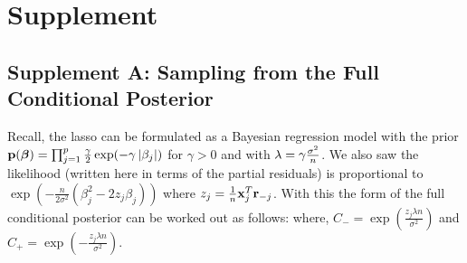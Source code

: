 \newpage

\section*{Supplement}

\subsection{Supplement A: Sampling from the Full Conditional Posterior}\label{Sup:A}


Recall, the lasso can be formulated as a Bayesian regression model with the prior $\mathbf{p}(\boldsymbol{\beta}) = \prod_{j = 1}^{p} \frac{\gamma}{2}\exp(-\gamma \left\lvert\beta_j\right\rvert)$ for $\gamma > 0$ and with $\lambda = \gamma \frac{\sigma^2}{n}$. We also saw the likelihood (written here in terms of the partial residuals) is proportional to $\exp(-\frac{n}{2\sigma^2} (\beta_j^2 - 2z_j\beta_j))$ where $z_{j} = \frac{1}{n} \mathbf{x}_{j}^{T}\mathbf{r}_{-j}$.  With this the form of the full conditional posterior can be worked out as follows:
where, $C_{-} = \exp(\frac{z_j \lambda n}{\sigma^2})$ and $C_{+} = \exp(-\frac{z_j \lambda n}{\sigma^2})$.

